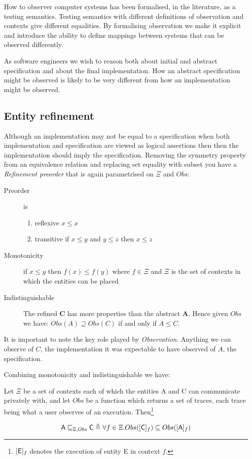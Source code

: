 How to observer computer systems has been formalised, in the literature, as a testing semantics. Testing semantics with different definitions of observation and contexts give different equalities. By formalising observation we make it explicit and introduce the ability to define mappings between systems that can be observed differently.

As software engineers we wish to reason both about  initial and abstract specification and about the final implementation. How an abstract specification might be observed is likely to be very different from how an implementation might be observed.

\subsection{Entity refinement}\label{sec:Eref}
 Although an implementation may not be equal to a specification when both implementation and specification are viewed as logical assertions then then the implementation should imply the specification.  Removing the symmetry property from an equivalence relation and replacing set equality with subset you have a  \emph{Refinement preorder} that is again parametrised on $\Xi$ and $Obs$:


\begin{description}
\item [Preorder] is
   \begin{enumerate}
     \item reflexive $x\leq x$
      \item transitive if $x\leq y$ and $y\leq z$ then $x\leq z$
   \end{enumerate}
 \item [Monotonicity] if $x\leq y$ then $f(x) \leq  f(y)$ where $f\in \Xi$ and $\Xi$ is the set of contexts in which the entities can be placed
 \item [ Indistinguishable]
 The  refined {\bf C} has more properties than the abstract {\bf A}.  Hence given $Obs$  we have:  $Obs(A) \supseteq  Obs(C)$ if and only if $A\leq C$.
\end{description}
It is important to note the key role played by \emph{Observation}. Anything we can observe of $C$, the implementation it was expectable to have  observed of $A$, the specification.

Combining monotonicity and indistinguishable  we have:

\begin{mypdef}\label{def:ref} 
Let $\Xi$ be a set of contexts each of which the entities {\sf A} and {\sf C} can communicate privately with, and let $Obs$ be a function which returns a set of traces, each trace being what a user observes of an execution. Then\footnote{$[{\sf E}]_f$ denotes the execution of entity {\sf E} in context $f$.}

$$
{\sf A} \sqsubseteq_{\Xi, Obs} {\sf  C} \triangleq   \forall {f \in \Xi }.Obs([{\sf C}]_f) \subseteq  Obs([{\sf  A}]_f)
$$
\end{mypdef} 

